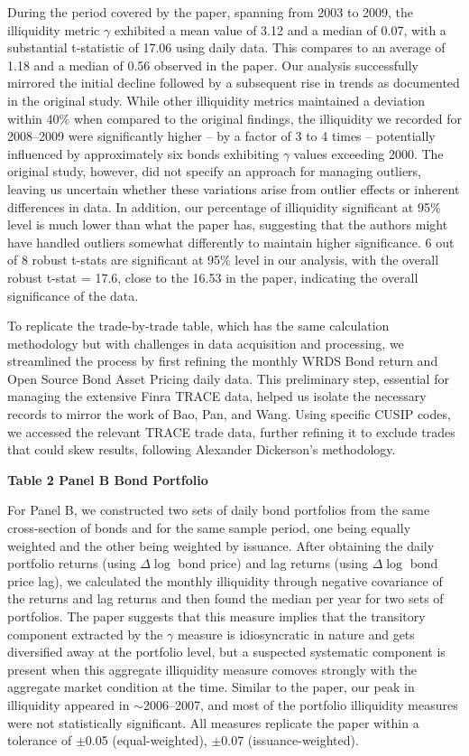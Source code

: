 \documentclass{article}
\begin{document}
During the period covered by the paper, spanning from 2003 to 2009, the illiquidity metric $\gamma$ exhibited a mean value of 3.12 and a median of 0.07, with a substantial t-statistic of 17.06 using daily data. This compares to an average of 1.18 and a median of 0.56 observed in the paper. Our analysis successfully mirrored the initial decline followed by a subsequent rise in trends as documented in the original study. While other illiquidity metrics maintained a deviation within 40\% when compared to the original findings, the illiquidity we recorded for 2008--2009 were significantly higher -- by a factor of 3 to 4 times -- potentially influenced by approximately six bonds exhibiting $\gamma$ values exceeding 2000. The original study, however, did not specify an approach for managing outliers, leaving us uncertain whether these variations arise from outlier effects or inherent differences in data. In addition, our percentage of illiquidity significant at 95\% level is much lower than what the paper has, suggesting that the authors might have handled outliers somewhat differently to maintain higher significance. 6 out of 8 robust t-stats are significant at 95\% level in our analysis, with the overall robust t-stat = 17.6, close to the 16.53 in the paper, indicating the overall significance of the data.

To replicate the trade-by-trade table, which has the same calculation methodology but with challenges in data acquisition and processing, we streamlined the process by first refining the monthly WRDS Bond return and Open Source Bond Asset Pricing daily data. This preliminary step, essential for managing the extensive Finra TRACE data, helped us isolate the necessary records to mirror the work of Bao, Pan, and Wang. Using specific CUSIP codes, we accessed the relevant TRACE trade data, further refining it to exclude trades that could skew results, following Alexander Dickerson's methodology.


\noindent\textbf{\small Table 2 Panel B Bond Portfolio}

For Panel B, we constructed two sets of daily bond portfolios from the same cross-section of bonds and for the same sample period, one being equally weighted and the other being weighted by issuance. After obtaining the daily portfolio returns (using $\Delta \log$ bond price) and lag returns (using $\Delta \log$ bond price lag), we calculated the monthly illiquidity through negative covariance of the returns and lag returns and then found the median per year for two sets of portfolios. The paper suggests that this measure implies that the transitory component extracted by the $\gamma$ measure is idiosyncratic in nature and gets diversified away at the portfolio level, but a suspected systematic component is present when this aggregate illiquidity measure comoves strongly with the aggregate market condition at the time. Similar to the paper, our peak in illiquidity appeared in $\sim$2006--2007, and most of the portfolio illiquidity measures were not statistically significant. All measures replicate the paper within a tolerance of $\pm$0.05 (equal-weighted), $\pm$0.07 (issuance-weighted).
\end{document}

